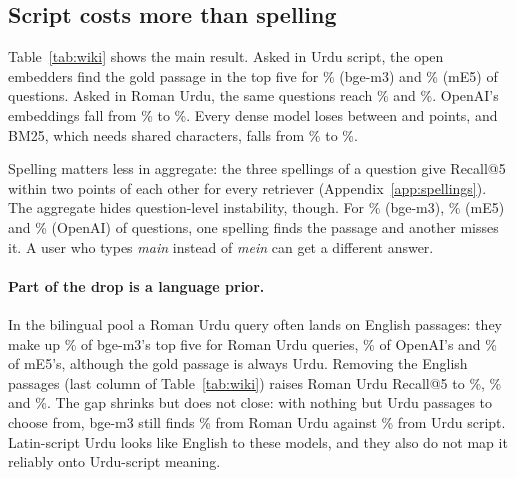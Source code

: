 

\subsection{Script costs more than spelling}

Table~\ref{tab:wiki} shows the main result. Asked in Urdu script, the open embedders find the gold passage in the top five for \% (bge-m3) and \% (mE5) of questions. Asked in Roman Urdu, the same questions reach \% and \%. OpenAI's embeddings fall from \% to \%. Every dense model loses between \WikiDropMin{} and \WikiDropMax{} points, and BM25, which needs shared characters, falls from \% to \%.

Spelling matters less in aggregate: the three spellings of a question give Recall@5 within two points of each other for every retriever (Appendix~\ref{app:spellings}). The aggregate hides question-level instability, though. For \% (bge-m3), \% (mE5) and \% (OpenAI) of questions, one spelling finds the passage and another misses it. A user who types \textit{main} instead of \textit{mein} can get a different answer.

\paragraph{Part of the drop is a language prior.} In the bilingual pool a Roman Urdu query often lands on English passages: they make up \% of bge-m3's top five for Roman Urdu queries, \% of OpenAI's and \% of mE5's, although the gold passage is always Urdu. Removing the English passages (last column of Table~\ref{tab:wiki}) raises Roman Urdu Recall@5 to \%, \% and \%. The gap shrinks but does not close: with nothing but Urdu passages to choose from, bge-m3 still finds \% from Roman Urdu against \% from Urdu script. Latin-script Urdu looks like English to these models, and they also do not map it reliably onto Urdu-script meaning.

